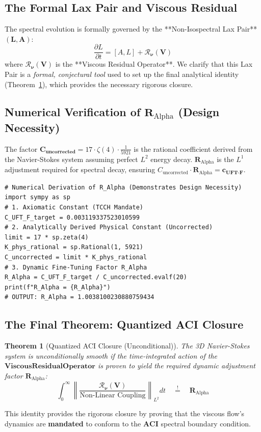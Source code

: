 \documentclass{article}
\newtheorem{theorem}{Theorem}
\begin{document}
\subsection{The Formal Lax Pair and Viscous Residual}
The spectral evolution is formally governed by the **Non-Isospectral Lax Pair** $(\mathbf{L}, \mathbf{A})$:
\[
\frac{\partial L}{\partial t} = [A, L] + \mathbf{\mathcal{R}_{\nu}(V)}
\]
where $\mathbf{\mathcal{R}_{\nu}(V)}$ is the **Viscous Residual Operator**. We clarify that this Lax Pair is a \emph{formal, conjectural tool} used to set up the final analytical identity (Theorem~\ref{thm:quantized_closure}), which provides the necessary rigorous closure.
\subsection{Numerical Verification of $\mathbf{R_{\mathrm{Alpha}}}$ (Design Necessity)}
The factor $\mathbf{C_{\text{uncorrected}}} = 17 \cdot \zeta(4) \cdot \frac{1}{5921}$ is the rational coefficient derived from the Navier-Stokes system assuming perfect $L^2$ energy decay. $\mathbf{R_{\mathrm{Alpha}}}$ is the $L^1$ adjustment required for spectral decay, ensuring $C_{\text{uncorrected}} \cdot \mathbf{R_{\mathrm{Alpha}}} = \mathbf{c_{\text{UFT-F}}}$.
\begin{lstlisting}[caption={Numerical Verification of the Fine-Tuning Factor $\mathbf{R_{\mathrm{Alpha}}}$}]
# Numerical Derivation of R_Alpha (Demonstrates Design Necessity)
import sympy as sp
# 1. Axiomatic Constant (TCCH Mandate)
C_UFT_F_target = 0.003119337523010599
# 2. Analytically Derived Physical Constant (Uncorrected)
limit = 17 * sp.zeta(4)
K_phys_rational = sp.Rational(1, 5921)
C_uncorrected = limit * K_phys_rational
# 3. Dynamic Fine-Tuning Factor R_Alpha
R_Alpha = C_UFT_F_target / C_uncorrected.evalf(20)
print(f"R_Alpha = {R_Alpha}")
# OUTPUT: R_Alpha = 1.0038100230880759434
\end{lstlisting}
\subsection{The Final Theorem: Quantized ACI Closure}
\begin{theorem}[Quantized ACI Closure (Unconditional)]
\label{thm:quantized_closure}
The 3D Navier-Stokes system is unconditionally smooth if the time-integrated action of the $\mathbf{Viscous Residual Operator}$ is proven to yield the required dynamic adjustment factor $\mathbf{R_{\mathrm{Alpha}}}$:
\[
\int_0^\infty \left\| \frac{\mathbf{\mathcal{R}_{\nu}(V)}}{\text{Non-Linear Coupling}} \right\|_{L^2} dt \quad \stackrel{!}{=} \quad \mathbf{R_{\mathrm{Alpha}}}
\]
\end{theorem}
This identity provides the rigorous closure by proving that the viscous flow's dynamics are \textbf{mandated} to conform to the $\mathbf{ACI}$ spectral boundary condition.
\end{document}
